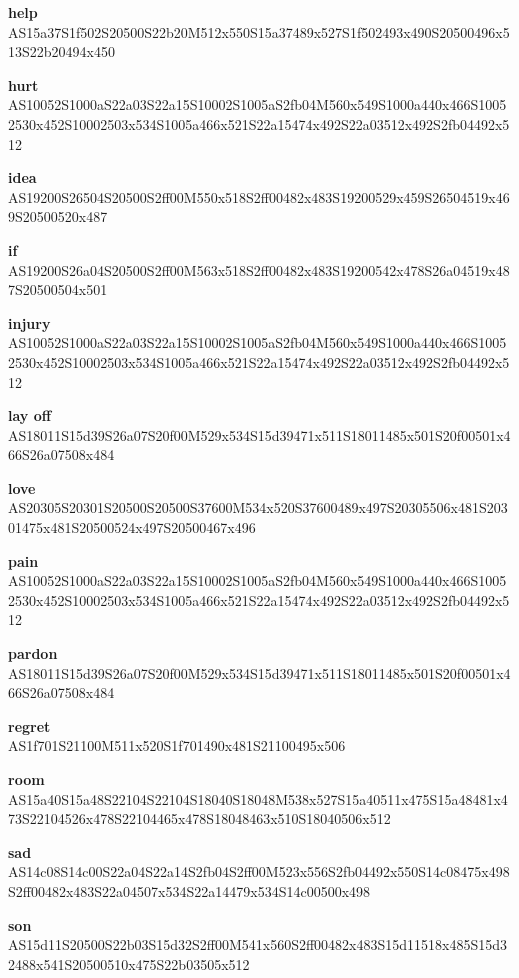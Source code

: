\documentclass{article}
\begin{document}
\begin{glossary}
\textbf{help}\\
AS15a37S1f502S20500S22b20M512x550S15a37489x527S1f502493x490S20500496x513S22b20494x450

\textbf{hurt}\\
AS10052S1000aS22a03S22a15S10002S1005aS2fb04M560x549S1000a440x466S10052530x452S10002503x534S1005a466x521S22a15474x492S22a03512x492S2fb04492x512

\textbf{idea}\\
AS19200S26504S20500S2ff00M550x518S2ff00482x483S19200529x459S26504519x469S20500520x487

\textbf{if}\\
AS19200S26a04S20500S2ff00M563x518S2ff00482x483S19200542x478S26a04519x487S20500504x501

\textbf{injury}\\
AS10052S1000aS22a03S22a15S10002S1005aS2fb04M560x549S1000a440x466S10052530x452S10002503x534S1005a466x521S22a15474x492S22a03512x492S2fb04492x512

\textbf{lay off}\\
AS18011S15d39S26a07S20f00M529x534S15d39471x511S18011485x501S20f00501x466S26a07508x484

\textbf{love}\\
AS20305S20301S20500S20500S37600M534x520S37600489x497S20305506x481S20301475x481S20500524x497S20500467x496

\textbf{pain}\\
AS10052S1000aS22a03S22a15S10002S1005aS2fb04M560x549S1000a440x466S10052530x452S10002503x534S1005a466x521S22a15474x492S22a03512x492S2fb04492x512

\textbf{pardon}\\
AS18011S15d39S26a07S20f00M529x534S15d39471x511S18011485x501S20f00501x466S26a07508x484

\textbf{regret}\\
AS1f701S21100M511x520S1f701490x481S21100495x506

\textbf{room}\\
AS15a40S15a48S22104S22104S18040S18048M538x527S15a40511x475S15a48481x473S22104526x478S22104465x478S18048463x510S18040506x512

\textbf{sad}\\
AS14c08S14c00S22a04S22a14S2fb04S2ff00M523x556S2fb04492x550S14c08475x498S2ff00482x483S22a04507x534S22a14479x534S14c00500x498

\textbf{son}\\
AS15d11S20500S22b03S15d32S2ff00M541x560S2ff00482x483S15d11518x485S15d32488x541S20500510x475S22b03505x512


\end{glossary}
\end{document}
